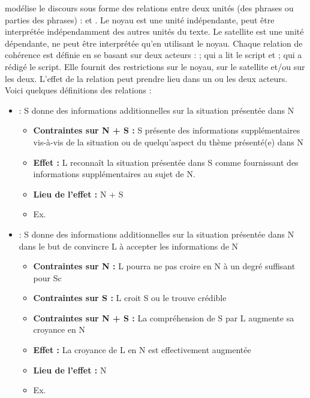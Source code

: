 \documentclass{KodeBook}
\begin{document}
 modélise le discours sous forme des relations entre deux unités (des phrases ou parties des phrases) :  et . 
Le noyau est une unité indépendante, peut être interprétée indépendamment des autres unités du texte.
Le satellite est une unité dépendante, ne peut être interprétée qu'en utilisant le noyau. 
Chaque relation de cohérence est définie en se basant sur deux acteurs :  ; qui a lit le script et  ;  qui a rédigé le script. 
Elle fournit des restrictions sur le noyau, sur le satellite et/ou sur les deux. 
L'effet de la relation peut prendre lieu dans un ou les deux acteurs. 
Voici quelques définitions des relations  \cite{2006-Cornish} :
\begin{itemize}
	\item {} :  S donne des informations additionnelles sur la situation présentée dans N
	\begin{itemize}
		\item \textbf{Contraintes sur N + S :} S présente des informations supplémentaires vis-à-vis de la situation ou de quelqu'aspect du thème présenté(e) dans N 
		\item \textbf{Effet :}  L reconnaît la situation présentée dans S comme fournissant des informations supplémentaires au sujet de N. 
		\item \textbf{Lieu de l'effet :} N + S
		\item Ex. 
	\end{itemize}

	\item {} :  S donne des informations additionnelles sur la situation présentée dans N dans le but de convincre L à accepter les informations de N
	\begin{itemize}
		\item \textbf{Contraintes sur N :} L pourra ne pas croire en N à un degré suffisant pour Sc
		\item \textbf{Contraintes sur S :} L croit S ou le trouve crédible
		\item \textbf{Contraintes sur N + S :} La compréhension de S par L augmente sa croyance en N
		\item \textbf{Effet :}  La croyance de L en N est effectivement augmentée
		\item \textbf{Lieu de l'effet :} N
		\item Ex. 
	\end{itemize}


\end{itemize}
\end{document}
